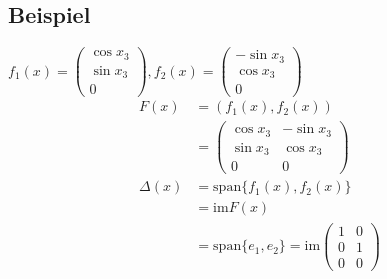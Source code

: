 \documentclass[ngerman]{tudscrreprt}
\begin{document}
\subsection*{Beispiel}
$f_1(x) = \begin{pmatrix} \cos{x_3}\\ \sin{x_3} \\ 0 \end{pmatrix}, f_2(x) = \begin{pmatrix} -\sin{x_3}\\ \cos{x_3}\\ 0 \end{pmatrix}$\\ 
\begin{align*}F(x) &= (f_1(x), f_2(x)) \\
&= \begin{pmatrix}
\cos{x_3} & -\sin{x_3}\\ \sin{x_3} & \cos{x_3}\\ 0& 0
\end{pmatrix}\\
\Delta(x)&= \text{span}\{ f_1(x), f_2(x) \}\\ 
&= \text{im}F(x) \\ 
&= \text{span}\{e_1,e_2\} = \text{im}\begin{pmatrix} 1&0\\ 0&1\\ 0&0 \end{pmatrix} 
\end{align*}
\end{document}
